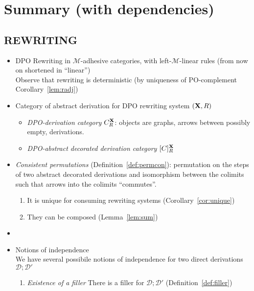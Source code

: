 \documentclass[a4paper,UKenglish,cleveref,pdftex,thm-restate,numberwithinsect,anonymous]{lipics}
\newcommand{\dpo}{\textsc{dpo}}
\def\R{\mathsf{R}}
\def\X{\textbf {\textup{X}}}
\newcommand{\dder}[1]{\mathscr{#1}}
\def\dpo{\mathsf{C}^{\X}_R}
\def\dpi{[\mathsf{C}]^{\X}_R}
\begin{document}

\iffalse
\section*{Summary (with dependencies)}

\subsection*{REWRITING}
\begin{itemize}
\item DPO Rewriting in $\mathcal{M}$-adhesive categories, with left-$\mathcal{M}$-linear rules (from now on shortened in ``linear'')\\
  Observe that rewriting is deterministic (by uniqueness of
  PO-complement Corollary~\ref{lem:radj})
  
\item Category of abstract derivation for DPO rewriting system $(\X, \R)$
  \begin{itemize}
  \item \emph{DPO-derivation category} $\dpo$: objects are graphs,
    arrows between possibly empty, derivations.
  \item \emph{DPO-abstract decorated derivation category} $\dpi$
  \end{itemize}
  
  
  
\item \emph{Consistent permutations} (Definition~\ref{def:permcon}):
  permutation on the steps of two abstract decorated derivations and
  isomorphism between the colimits such that arrows into the colimits
  ``commutes''.
  \begin{enumerate}
  \item It is unique for consuming
    rewriting systems (Corollary~\ref{cor:unique})
  \item They can be composed
    (Lemma~\ref{lem:sum})
  \end{enumerate}
\item
  
  
\item Notions of independence\\ We have several
  possibile notions of independence for two direct derivations $\dder{D}
  ; \dder{D'}$
  \begin{enumerate}
    
  \item \emph{Existence of a filler} There
is a filler for $\dder{D} ; \dder{D'}$ (Definition~\ref{def:filler})


\end{enumerate}
\end{itemize}
\end{document}
